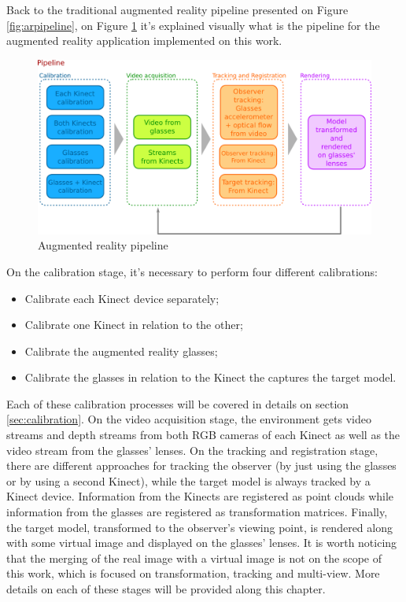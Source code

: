 \documentclass[msc, a4paper, classic, en]{ufbathesis}
\begin{document}
Back to the traditional augmented reality pipeline presented on Figure \ref{fig:arpipeline}, on Figure \ref{fig:pipeline} it's explained visually what is the pipeline for the augmented reality application implemented on this work.

\begin{figure}
\centering
\includegraphics[width=1\textwidth]{images/pipeline.png}
\caption{Augmented reality pipeline}
\label{fig:pipeline}
\end{figure}

On the calibration stage, it's necessary to perform four different calibrations:

\begin{itemize}
  \item Calibrate each Kinect device separately;
  \item Calibrate one Kinect in relation to the other;
  \item Calibrate the augmented reality glasses;
  \item Calibrate the glasses in relation to the Kinect the captures the target model.
\end{itemize}

Each of these calibration processes will be covered in details on section \ref{sec:calibration}. On the video acquisition stage, the environment gets video streams and depth streams from both RGB cameras of each Kinect as well as the video stream from the glasses' lenses. On the tracking and registration stage, there are different approaches for tracking the observer (by just using the glasses or by using a second Kinect), while the target model is always tracked by a Kinect device. Information from the Kinects are registered as point clouds while information from the glasses are registered as transformation matrices. Finally, the target model, transformed to the observer's viewing point, is rendered along with some virtual image and displayed on the glasses' lenses. It is worth noticing that the merging of the real image with a virtual image is not on the scope of this work, which is focused on transformation, tracking and multi-view. More details on each of these stages will be provided along this chapter.
\end{document}
